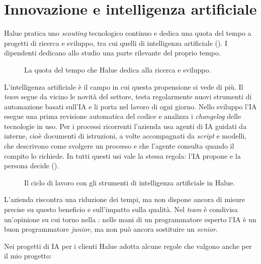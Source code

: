 
\section{Innovazione e intelligenza artificiale}
\label{sec:innovazione}

Halue pratica uno \emph{scouting} tecnologico continuo e dedica una quota del tempo a progetti di
ricerca e sviluppo, tra cui quelli di intelligenza artificiale (). I dipendenti
dedicano allo studio una parte rilevante del proprio tempo.

\begin{figure}[htbp]
	\centering
	
	\caption{La quota del tempo che Halue dedica alla ricerca e sviluppo.}
	\label{fig:ricerca}
\end{figure}

L’intelligenza artificiale è il campo in cui questa propensione si vede di più. Il \emph{team}
segue da vicino le novità del settore, testa regolarmente nuovi strumenti di automazione basati
sull’IA e li porta nel lavoro di ogni giorno. Nello sviluppo l’IA esegue una prima revisione
automatica del codice e analizza i \emph{changelog} delle tecnologie in uso. Per i processi
ricorrenti l’azienda usa agenti di IA guidati da  interne, cioè
documenti di istruzioni, a volte accompagnati da \emph{script} e modelli, che descrivono come
svolgere un processo e che l’agente consulta quando il compito lo richiede. In tutti questi usi vale la stessa regola: l’IA propone
e la persona decide ().

\begin{figure}[htbp]
	\centering
	
	\caption{Il ciclo di lavoro con gli strumenti di intelligenza artificiale in Halue.}
	\label{fig:ciclo-ia}
\end{figure}

L’azienda riscontra una riduzione dei tempi, ma non dispone ancora di misure precise su questo
beneficio e sull’impatto sulla qualità. Nel \emph{team} è condivisa un’opinione su cui torno nella
: nelle mani di un programmatore esperto l’IA è un buon programmatore
\emph{junior}, ma non può ancora sostituire un \emph{senior}.

Nei progetti di IA per i clienti Halue adotta alcune regole che valgono anche per il mio progetto:

